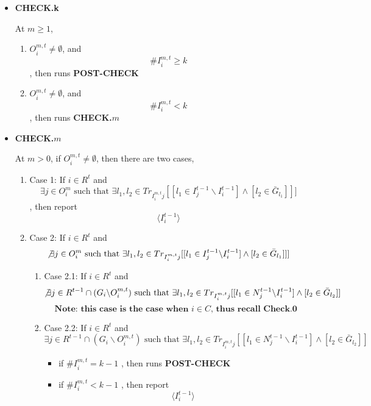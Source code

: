 \documentclass[12pt,letterpaper]{article}
\theoremstyle{definition}
\theoremstyle{remark}
\theoremstyle{claim}
\begin{document}
\begin{itemize}
\begin{enumerate}
\begin{itemize}
\end{itemize}
\end{enumerate}






\item \textbf{CHECK.k}

At $m\geq 1$, 
\begin{enumerate}


\item $O^{m,t}_i\neq \emptyset$, and
 \[\# I^{m,t}_i\geq k\]
, then runs
\textbf{POST-CHECK }

\item $O^{m,t}_i\neq \emptyset$, and 
\[ \#I^{m,t}_i< k\]
, then runs \textbf{CHECK.$m$}
\end{enumerate}


\item \textbf{CHECK.$m$}

 At $m>0$, if $O^{m,t}_i\neq \emptyset$, then there are two cases, 
\begin{enumerate}
\item Case 1: If $i\in R^t$ and 
\[\exists j\in  O^m_i \text{ such that }\exists l_1,l_2\in Tr_{I^{m,t}_ij}[[l_1\in I^{t-1}_j\backslash I^{t-1}_i] \wedge [l_2\in \bar{G}_{l_1}]]]\]
, then report 
\[\langle I^{t-1}_i \rangle\]
\item Case 2: If $i\in R^t$ and 
\[\not\exists j\in  O^m_i \text{ such that }\exists l_1,l_2\in Tr_{I^{m,t}_ij}[[l_1\in I^{t-1}_j\backslash I^{t-1}_i] \wedge [l_2\in \bar{G}_{l_1}]]]\]

\begin{enumerate}
\item Case 2.1: If $i\in R^t$ and 
\[\not\exists j\in R^{t-1}\cap (G_i\backslash  O^{m,t}_i) \text{ such that }\exists l_1,l_2\in Tr_{I^{m,t}_ij}[[l_1\in N^{t-1}_j\backslash I^{t-1}_i] \wedge [l_2\in \bar{G}_{l_2}]]\]
\[\textbf{Note: this case is the case when $i\in C$, thus recall Check.0}\]

\item Case 2.2: If $i\in R^t$ and 
\[\exists j\in R^{t-1}\cap (G_i\backslash  O^{m,t}_i) \text{ such that }\exists l_1,l_2\in Tr_{I^{m,t}_ij}[[l_1\in N^{t-1}_j\backslash I^{t-1}_i] \wedge [l_2\in \bar{G}_{l_2}]]\]

\begin{itemize}
\item if $\# I^{m,t}_i= k-1$
, then runs
\textbf{POST-CHECK }

\item if $\# I^{m,t}_i< k-1$
, then report 
\[\langle I^{t-1}_i \rangle\]
\end{itemize}






\end{enumerate}
\end{enumerate}
\end{itemize}
\end{document}
